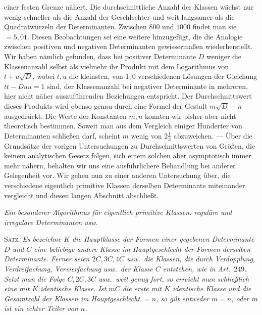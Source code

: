 einer festen Grenze nähert. Die durchschnittliche Anzahl der Klassen wächst nur wenig schneller als die Anzahl der Geschlechter und weit langsamer als die Quadratwurzeln der Determinanten. Zwischen \(800\) und \(1000\) findet man sie \(=5,01\). Diesen Beobachtungen sei eine weitere hinzugefügt, die die Analogie zwischen positiven und negativen Determinanten gewissermaßen wiederherstellt. Wir haben nämlich gefunden, dass bei positiver Determinante \(D\) weniger die Klassenanzahl selbst als vielmehr ihr Produkt mit dem Logarithmus von \(t+u\surd D\), wobei \(t,u\) die kleinsten, von \(1,0\) verschiedenen Lösungen der Gleichung \(tt-Duu=1\) sind, der Klassenanzahl bei negativer Determinante in mehreren, hier nicht näher auszuführenden Beziehungen entspricht. Der Durchschnittswert dieses Produkts wird ebenso genau durch eine Formel der Gestalt \(m\surd D-n\) ausgedrückt. Die Werte der Konstanten \(m,n\) konnten wir bisher aber nicht theoretisch bestimmen. Soweit man aus dem Vergleich einiger Hunderter von Determinanten schließen darf, scheint \(m\) wenig von \(2\frac13\) abzuweichen. — Über die Grundsätze der vorigen Untersuchungen zu Durchschnittswerten von Größen, die keinem analytischen Gesetz folgen, sich einem solchen aber asymptotisch immer mehr nähern, behalten wir uns eine ausführlichere Behandlung bei anderer Gelegenheit vor. Wir gehen nun zu einer anderen Untersuchung über, die verschiedene eigentlich primitive Klassen derselben Determinante miteinander vergleicht und diesen langen Abschnitt abschließt.

\begin{center}\textit{Ein besonderer Algorithmus für eigentlich primitive Klassen: reguläre und irreguläre Determinanten usw.}\end{center}

\textsc{Satz.} \textit{Es bezeichne \(K\) die Hauptklasse der Formen einer gegebenen Determinante \(D\) und \(C\) eine beliebige andere Klasse im Hauptgeschlecht der Formen derselben Determinante. Ferner seien \(2C,3C, 4C\) usw.\ die Klassen, die durch Verdopplung, Verdreifachung, Vervierfachung usw.\ der Klasse \(C\) entstehen, wie in Art.\ \(249\). Setzt man die Folge \(C,2C,3C\) usw.\ weit genug fort, so erreicht man schließlich eine mit \(K\) identische Klasse. Ist \(mC\) die erste mit \(K\) identische Klasse und die Gesamtzahl der Klassen im Hauptgeschlecht \(=n\), so gilt entweder \(m=n\), oder \(m\) ist ein echter Teiler von \(n\).}

